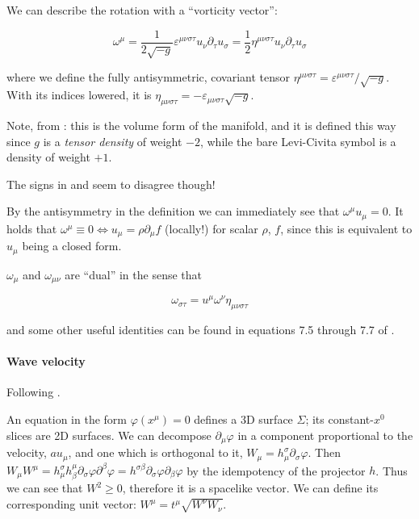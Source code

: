 \documentclass[main.tex]{subfiles}
\begin{document}
We can describe the rotation with a ``vorticity vector'':

\begin{equation}
    \omega^\mu = \frac{1}{2 \sqrt{-g}} \varepsilon^{\mu\nu\sigma\tau} u_\nu \partial_\tau u_{\sigma} = \frac{1}{2} \eta^{\mu\nu\sigma\tau} u_\nu \partial_\tau u_{\sigma}
\end{equation}

where we define the fully antisymmetric, covariant tensor \(\eta^{\mu\nu\sigma\tau} = \varepsilon^{\mu\nu\sigma\tau} / \sqrt{-g} \). With its indices lowered, it is
\(\eta_{\mu\nu\sigma\tau} = - \varepsilon_{\mu\nu\sigma\tau} \sqrt{-g} \).

Note, from \cite[pages 51--52]{Carroll:1997ar}: this is the volume form of the manifold, and it is defined this way since \(g\) is a \emph{tensor density} of weight $-2$, while the bare Levi-Civita symbol is a density of weight $+1$.

\begin{greenbox}
  The signs in \cite[]{Taub:1978} and \cite[]{Carroll:1997ar} seem to disagree though!
\end{greenbox}

By the antisymmetry in the definition we can immediately see that \(\omega^\mu u_\mu=0\). It holds that \(\omega^\mu \equiv 0 \iff u_\mu = \rho \partial_\mu f \) (locally!) for scalar \(\rho\), \(f\), since this is equivalent to \(u_\mu\) being a closed form.

\(\omega_\mu\) and \(\omega_{\mu \nu}\) are ``dual'' in the sense that

\begin{equation}
    \omega _{\sigma\tau} = u^\mu \omega^\nu \eta_{\mu \nu \sigma \tau}
\end{equation}

and some other useful identities can be found in equations 7.5 through 7.7 of \cite[]{Taub:1978}.

\paragraph{Wave velocity}

Following \cite[section 5]{Taub:1978}.

An equation in the form \(\varphi (x^\mu) = 0\) defines a 3D surface \(\Sigma\); its constant-\(x^0\) slices are 2D surfaces. We can decompose \(\partial_\mu \varphi\) in a component proportional to the velocity, \(a u_\mu\), and one which is orthogonal to it, \(W_\mu = h^\sigma_\mu \partial_\sigma \varphi\). Then \(W_\mu W^\mu = h^\sigma_\mu  h_\beta^\mu \partial_\sigma \varphi \partial^\beta \varphi = h^{\sigma\beta} \partial_\sigma \varphi \partial_\beta \varphi\)
by the idempotency of the projector \(h\).
Thus we can see that \(W^2 \geq 0\), therefore it is a spacelike vector. We can define its corresponding unit vector: \(W^\mu = t^\mu \sqrt{W^\nu W_\nu}\).
\end{document}

